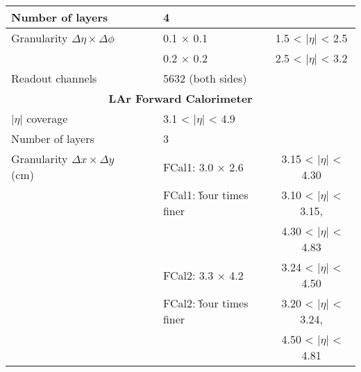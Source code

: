 \begin{table}[]
\begin{tabular}{|l|lc|lc|}
Number of layers                               &                   &                                    & 4                               &                                     \\
\hline 
Granularity $\Delta \eta \times \Delta \phi$   &                   &                                    & 0.1 × 0.1                       & 1.5 < $|\eta|$ < 2.5     \\
                                               &                   &                                    & 0.2 × 0.2                       & 2.5 < $|\eta|$ < 3.2     \\
\hline 
Readout channels                               &                   &                                    & 5632 (both sides)               &                                     \\
\hline 
                                                       \multicolumn{5}{|c|}{\textbf{LAr Forward Calorimeter}} \\
\hline 
$|\eta|$ coverage                              &                   &                                    & 3.1 < $|\eta|$ < 4.9 &                                     \\
Number of layers                               &                   &                                    & 3                               &                                     \\
\hline 
Granularity $\Delta x \times \Delta y$ (cm)    &                   &                                    & FCal1: 3.0 × 2.6                & 3.15 < $|\eta|$ < 4.30   \\
                                               &                   &                                    & FCal1: \~ four times finer       & 3.10 < $|\eta|$ < 3.15,  \\
                                               &                   &                                    &                                 & 4.30 < $|\eta|$ < 4.83   \\
                                               &                   &                                    & FCal2: 3.3 × 4.2                & 3.24 < $|\eta|$ < 4.50   \\
                                               &                   &                                    & FCal2: \~ four times finer       & 3.20 < $|\eta|$ < 3.24,  \\
                                               &                   &                                    &                                 & 4.50 < $|\eta|$ < 4.81   \\

\end{tabular}
\end{table}
